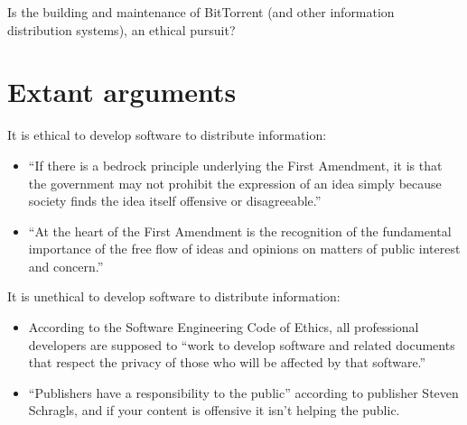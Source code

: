 \documentclass[11pt]{article}
\begin{document}
Is the building and maintenance of BitTorrent (and other information distribution systems), an ethical pursuit?


\section{Extant arguments}

It is ethical to develop software to distribute information:
\begin{itemize}
\item ``If there is a bedrock principle underlying the First Amendment, it is that the government may not prohibit the expression of an idea simply because society finds the idea itself offensive or disagreeable.'' \cite[414]{1989texas}
\item ``At the heart of the First Amendment is the recognition of the fundamental importance of the free flow of ideas and opinions on matters of public interest and concern.'' \cite[51]{1988hustler}
\end{itemize}
It is unethical to develop software to distribute information:
\begin{itemize}
\item According to the Software Engineering Code of Ethics, all professional developers are supposed to ``work to develop software and related documents that respect the privacy of those who will be affected by that software.'' \cite[3.12]{secode}
\item ``Publishers have a responsibility to the public'' according to publisher Steven Schragls, and if your content is offensive it isn't helping the public. \cite[46]{hawker}
\end{itemize}
\end{document}
